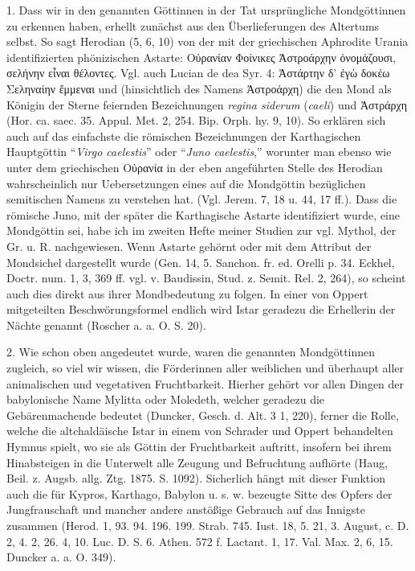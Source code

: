 \documentclass[a4paper, 11pt, oneside]{article}
\begin{document}
1. Dass wir in den genannten Göttinnen in der Tat ursprüngliche Mondgöttinnen zu erkennen haben, erhellt zunächst aus den Überlieferungen des Altertums selbst. So sagt Herodian (5, 6, 10) von der mit der griechischen Aphrodite Urania identifizierten phönizischen Astarte: Οὐρανίαν Φοίνικες Ἀστροάρχην ὀνομάζουσι, σελήνην εἶναι θέλοντες. Vgl. auch Lucian de dea Syr. 4: Ἀστάρτην δ' ἐγὼ δοκέω Σεληναίην ἔμμεναι und (hinsichtlich des Namens Ἀστροάρχη) die den Mond als Königin der Sterne feiernden Bezeichnungen \emph{regina siderum} (\emph{caeli}) und Ἀστράρχη (Hor. ca. saec. 35. Appul. Met. 2, 254. Bip. Orph. hy. 9, 10). So erklären sich auch auf das einfachste die römischen Bezeichnungen der Karthagischen Hauptgöttin "`\emph{Virgo caelestis}"' oder "`\emph{Juno caelestis},"' worunter man ebenso wie unter dem griechischen Οὐρανία in der eben angeführten Stelle des Herodian wahrscheinlich nur Uebersetzungen eines auf die Mondgöttin bezüglichen semitischen Namens zu verstehen hat. (Vgl. Jerem. 7, 18 u. 44, 17 ff.). Dass die römische Juno, mit der später die Karthagische Astarte identifiziert wurde, eine Mondgöttin sei, habe ich im zweiten Hefte meiner Studien zur vgl. Mythol, der Gr. u. R. nachgewiesen. Wenn Astarte gehörnt oder mit dem Attribut der Mondsichel dargestellt wurde (Gen. 14, 5. Sanchon. fr. ed. Orelli p. 34. Eckhel, Doctr. num. 1, 3, 369 ff. vgl. v. Baudissin, Stud. z. Semit. Rel. 2, 264), so scheint auch dies direkt aus ihrer Mondbedeutung zu folgen. In einer von Oppert mitgeteilten Beschwörungsformel endlich wird Istar geradezu die Erhellerin der Nächte genannt (Roscher a. a. O. S. 20).

2. Wie schon oben angedeutet wurde, waren die genannten Mondgöttinnen zugleich, so viel wir wissen, die Förderinnen aller weiblichen und überhaupt aller animalischen und vegetativen Fruchtbarkeit. Hierher gehört vor allen Dingen der babylonische Name Mylitta oder Moledeth, welcher geradezu die Gebärenmachende bedeutet (Duncker, Gesch. d. Alt. 3 1, 220), ferner die Rolle, welche die altchaldäische Istar in einem von Schrader und Oppert behandelten Hymnus spielt, wo sie als Göttin der Fruchtbarkeit auftritt, insofern bei ihrem Hinabsteigen in die Unterwelt alle Zeugung und Befruchtung aufhörte (Haug, Beil. z. Augsb. allg. Ztg. 1875. S. 1092). Sicherlich hängt mit dieser Funktion auch die für Kypros, Karthago, Babylon u. s. w. bezeugte Sitte des Opfers der Jungfrauschaft und mancher andere anstößige Gebrauch auf das Innigste zusammen (Herod. 1, 93. 94. 196. 199. Strab. 745. Iust. 18, 5. 21, 3. August, c. D. 2, 4. 2, 26. 4, 10. Luc. D. S. 6. Athen. 572 f. Lactant. 1, 17. Val. Max. 2, 6, 15. Duncker a. a. O. 349).
\end{document}
